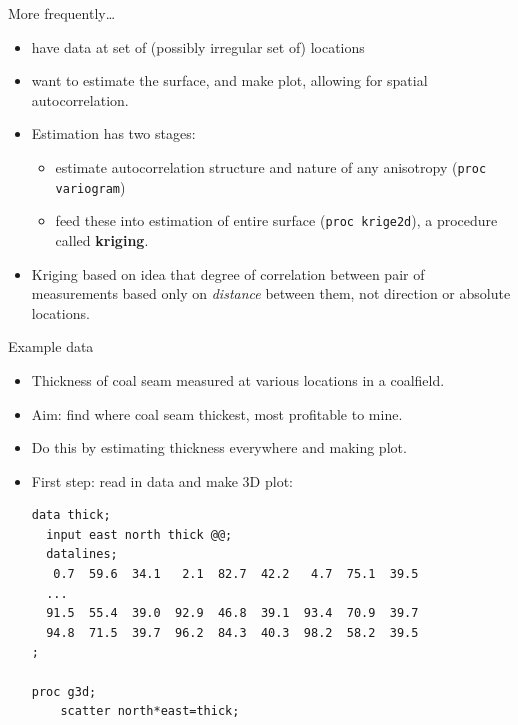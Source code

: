 \begin{frame}{More frequently\ldots}

  \begin{itemize}
  \item have data at set of (possibly irregular set of) locations
  \item want to estimate the surface, and make plot, allowing for
    spatial autocorrelation.
  \item Estimation has two stages:
    \begin{itemize}
    \item estimate autocorrelation structure and nature of any
      anisotropy (\texttt{proc variogram})
    \item feed these into estimation of entire surface (\texttt{proc
        krige2d}), a procedure called \textbf{kriging}.
    \end{itemize}
  \item Kriging based on idea that degree of correlation between pair
    of measurements based only on \emph{distance} between them, not
    direction or absolute locations.
  \end{itemize}
  
\end{frame}


\begin{frame}[fragile]{Example data}

  \begin{itemize}
  \item Thickness of coal seam measured at various locations in a coalfield.
  \item Aim: find where coal seam thickest, most profitable to mine.
  \item Do this by estimating thickness everywhere and making plot.
  \item First step: read in data and make 3D plot:

\begin{verbatim}
data thick; 
  input east north thick @@; 
  datalines; 
   0.7  59.6  34.1   2.1  82.7  42.2   4.7  75.1  39.5  
  ...
  91.5  55.4  39.0  92.9  46.8  39.1  93.4  70.9  39.7  
  94.8  71.5  39.7  96.2  84.3  40.3  98.2  58.2  39.5 
;

proc g3d;
    scatter north*east=thick;

\end{verbatim}
  \end{itemize}
  
\end{frame}

